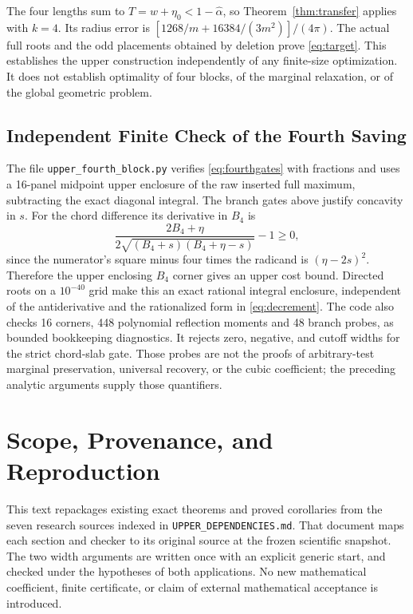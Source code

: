 \documentclass[11pt,letterpaper]{article}
\newcommand{\al}{\widehat\alpha}
\begin{document}
The four lengths sum to $T=w+\eta_0<1-\al$, so
Theorem~\ref{thm:transfer} applies with $k=4$. Its radius error is
$[1268/m+16384/(3m^2)]/(4\pi)$. The actual full roots and the odd
placements obtained by deletion prove \eqref{eq:target}. This establishes
the upper construction independently of any finite-size optimization.
It does not establish optimality of four blocks, of the marginal
relaxation, or of the global geometric problem.

\subsection{Independent Finite Check of the Fourth Saving}
The file \texttt{upper\_fourth\_block.py} verifies
\eqref{eq:fourthgates} with fractions and uses a 16-panel midpoint upper
enclosure of the raw inserted full maximum, subtracting the exact
diagonal integral. The branch gates above justify concavity in $s$.
For the chord difference its derivative in $B_4$ is
\[
 \frac{2B_4+\eta}{2\sqrt{(B_4+s)(B_4+\eta-s)}}-1\ge0,
\]
since the numerator's square minus four times the radicand is
$(\eta-2s)^2$. Therefore the upper enclosing $B_4$ corner gives an
upper cost bound. Directed roots on a $10^{-40}$ grid make this an exact
rational integral enclosure, independent of the antiderivative and the
rationalized form in \eqref{eq:decrement}. The code also checks 16 corners,
448 polynomial reflection moments and 48 branch probes, as bounded
bookkeeping diagnostics. It rejects zero, negative, and cutoff widths
for the strict chord-slab gate. Those probes are not the proofs of
arbitrary-test marginal preservation, universal recovery, or the cubic
coefficient; the preceding analytic arguments supply those quantifiers.

\section{Scope, Provenance, and Reproduction}
This text repackages existing exact theorems and proved corollaries from
the seven research sources indexed in \texttt{UPPER\_DEPENDENCIES.md}.
That document maps each section and checker to its original source at
the frozen scientific snapshot. The two width arguments are written once
with an explicit generic start, and checked under the hypotheses of both
applications. No new mathematical coefficient, finite certificate, or
claim of external mathematical acceptance is introduced.
\end{document}

